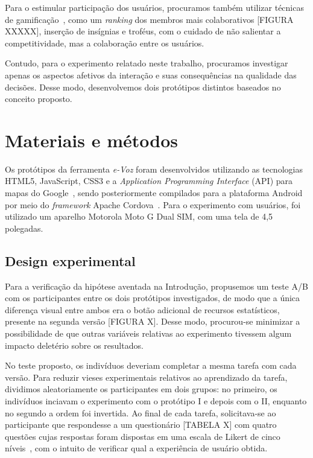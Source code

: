 \documentclass{sigchi}
\begin{document}
Para o estimular participação dos usuários, procuramos também utilizar técnicas de gamificação~\cite{deterding:2011}, como um \textit{ranking} dos membros mais colaborativos [FIGURA XXXXX], inserção de insígnias e troféus, com o cuidado de não salientar a competitividade, mas a colaboração entre os usuários. 

Contudo, para o experimento relatado neste trabalho, procuramos investigar apenas os aspectos afetivos da interação e suas consequências na qualidade das decisões. Desse modo, desenvolvemos dois protótipos distintos baseados no conceito proposto.



\section{Materiais e métodos}
Os protótipos da ferramenta \textit{e-Voz} foram desenvolvidos utilizando as tecnologias HTML5, JavaScript, CSS3 e a \textit{Application Programming Interface} (API) para mapas do Google~\cite{googlemaps:2016}, sendo posteriormente compilados para a plataforma Android por meio do \textit{framework} Apache Cordova~\cite{cordova:2016}. Para o experimento com usuários, foi utilizado um aparelho Motorola Moto G Dual SIM, com uma tela de 4,5 polegadas.

\subsection{Design experimental}
Para a verificação da hipótese aventada na Introdução, propusemos um teste A/B com os participantes entre os dois protótipos investigados, de modo que a única diferença visual entre ambos era o botão adicional de recursos estatísticos, presente na segunda versão [FIGURA X]. Desse modo, procurou-se minimizar a possibilidade de que outras variáveis relativas ao experimento tivessem algum impacto deletério sobre os resultados.

No teste proposto, os indivíduos deveriam completar a mesma tarefa com cada versão. Para reduzir vieses experimentais relativos ao aprendizado da tarefa, dividimos aleatoriamente os participantes em dois grupos: no primeiro, os indivíduos inciavam o experimento com o protótipo I e depois com o II, enquanto no segundo a ordem foi invertida. Ao final de cada tarefa, solicitava-se ao participante que respondesse a um questionário [TABELA X] com quatro questões cujas respostas foram dispostas em uma escala de Likert de cinco níveis~\cite{likert:1932}, com o intuito de verificar qual a experiência de usuário obtida.
\end{document}
